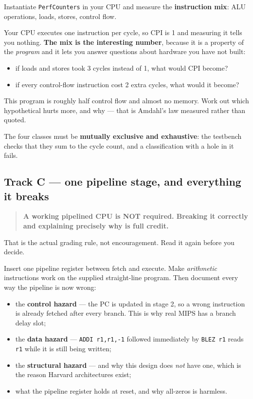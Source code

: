 \documentclass[11pt]{article}
\newcommand{\code}[1]{\texttt{#1}}
\begin{document}
Instantiate \code{PerfCounters} in your CPU and measure the \textbf{instruction
mix}: ALU operations, loads, stores, control flow.

Your CPU executes one instruction per cycle, so CPI is 1 and measuring it tells
you nothing. \textbf{The mix is the interesting number}, because it is a property
of the \emph{program} and it lets you answer questions about hardware you have not
built:

\begin{itemize}[leftmargin=1.6em,itemsep=1pt]
\item if loads and stores took 3 cycles instead of 1, what would CPI become?
\item if every control-flow instruction cost 2 extra cycles, what would it become?
\end{itemize}

This program is roughly half control flow and almost no memory. Work out which
hypothetical hurts more, and why --- that is Amdahl's law measured rather than
quoted.

The four classes must be \textbf{mutually exclusive and exhaustive}: the testbench
checks that they sum to the cycle count, and a classification with a hole in it
fails.

\subsection*{Track C --- one pipeline stage, and everything it breaks}

\begin{quote}
\textbf{A working pipelined CPU is NOT required. Breaking it correctly and
explaining precisely why is full credit.}
\end{quote}

That is the actual grading rule, not encouragement. Read it again before you
decide.

Insert one pipeline register between fetch and execute. Make \emph{arithmetic}
instructions work on the supplied straight-line program. Then document every way
the pipeline is now wrong:

\begin{itemize}[leftmargin=1.6em,itemsep=1pt]
\item the \textbf{control hazard} --- the PC is updated in stage 2, so a wrong
instruction is already fetched after every branch. This is why real MIPS has a
branch delay slot;
\item the \textbf{data hazard} --- \code{ADDI r1,r1,-1} followed immediately by
\code{BLEZ r1} reads \code{r1} while it is still being written;
\item the \textbf{structural hazard} --- and why this design does \emph{not} have
one, which is the reason Harvard architectures exist;
\item what the pipeline register holds at reset, and why all-zeros is harmless.
\end{itemize}
\end{document}
